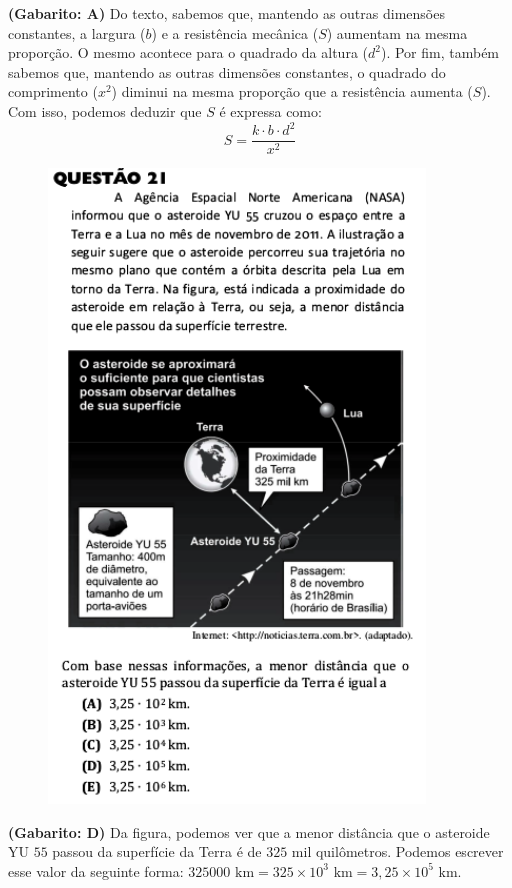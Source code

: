 \documentclass[a4paper]{article}
\begin{document}
\par\textbf{(Gabarito: A)} Do texto, sabemos que, mantendo as outras dimensões constantes, a largura ($b$) e a resistência mecânica ($S$) aumentam na mesma proporção. O mesmo acontece para o quadrado da altura ($d^2$). Por fim, também sabemos que, mantendo as outras dimensões constantes, o quadrado do comprimento ($x^2$) diminui na mesma proporção que a resistência aumenta ($S$). Com isso, podemos deduzir que $S$ é expressa como:
\begin{equation*}
S = \frac{k\cdot b\cdot d^2}{x^2}
\end{equation*}
\begin{figure}[H]
	\begin{center}
		\includegraphics[width=10cm]{L2Q21.png}
	\end{center}
\end{figure}
\par\textbf{(Gabarito: D)} Da figura, podemos ver que a menor distância que o asteroide YU $55$ passou da superfície da Terra é de $325$ mil quilômetros. Podemos escrever esse valor da seguinte forma: $325000\text{ km} = 325\times 10^3\text{ km} = 3,25\times 10^5\text{ km}$.
\end{document}
